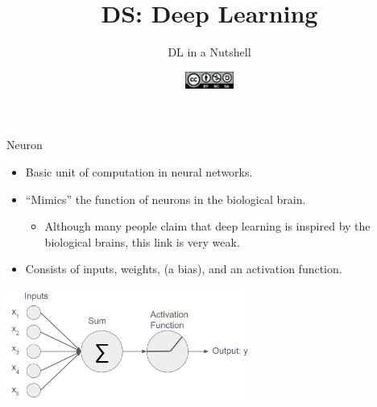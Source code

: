 \documentclass[aspectratio=169]{../latex_main/tntbeamer}  %
\title[DL in a Nutshell]{DS: Deep Learning}
\subtitle{DL in a Nutshell}
\date{\hspace{0.5em} {\includegraphics[height=1.5em]{../latex_main/figures/Cc-by-nc-sa_icon.svg.png}}}
\begin{document}
	
	\maketitle
	\begin{frame}{Neuron}

        \begin{itemize}
            \item Basic unit of computation in neural networks.
            \item ``Mimics'' the function of neurons in the biological brain.
            \begin{itemize}
                \item Although many people claim that deep learning is inspired by the biological brains, this link is very weak.
            \end{itemize}
            \item Consists of inputs, weights, (a bias), and an activation function.
        \end{itemize}
       
        \centering
        \includegraphics[width=0.6\textwidth]{figures/neuron.png}
                
	\end{frame}
\end{document}
